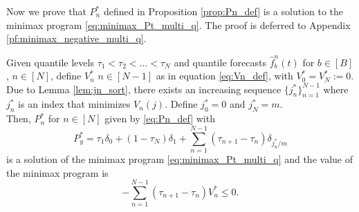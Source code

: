 Now we prove that $P_n^*$ defined in Proposition \ref{prop:Pn_def} is a solution to the minimax program \eqref{eq:minimax_Pt_multi_q}. The proof is deferred to Appendix \ref{pf:minimax_negative_multi_q}.

\begin{theorem}\label{thm:minimax_negative_multi_q} 
Given quantile levels $\tau_1 < \tau_2 < ... < \tau_N$ and quantile forecasts $\hat{f}_b^n(t)$ for $b \in [B]$, $n \in [N]$, define $V_n^*$ $n \in [N-1]$ as in equation \eqref{eq:Vn_def}, with $V_0^* = V_N^* := 0$. Due to Lemma \ref{lem:jn_sort}, there exists an increasing sequence $\{j_n^*\}_{n=1}^{N-1}$ where $j_n^*$ is an index that minimizes $V_n(j)$. Define $j_0^* = 0$ and $j_N^* = m$.
\smallskip \\
Then, $P_n^*$ for $n \in [N]$ given by \eqref{eq:Pn_def} with 
\[
P_y^* = \tau_1 \delta_0 + (1-\tau_N)\delta_1 + \sum_{n=1}^{N-1}(\tau_{n+1}-\tau_n)\delta_{j_n^*/m}
\]
is a solution of the minimax program \eqref{eq:minimax_Pt_multi_q} and the value of the minimax program is 
\[
-\sum_{n=1}^{N-1}(\tau_{n+1}-\tau_n)V_n^* \leq 0.
\]
\end{theorem}



